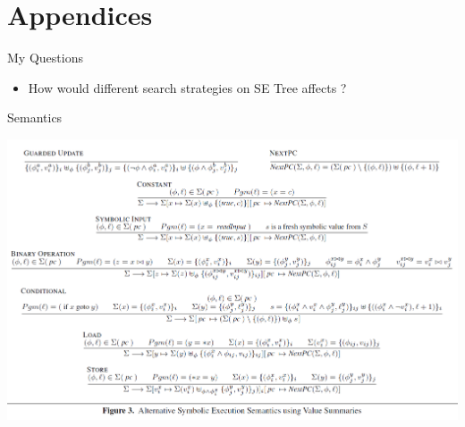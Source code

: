 \documentclass[xcolor={dvipsnames,table},16pt]{beamer}
\begin{document}
\begin{frame}
    \printbibliography
\end{frame}

\appendix

\section*{Appendices}

\begin{frame}{My Questions}
\begin{itemize}
	\item How would different search strategies on SE Tree affects \MultiSE?
\end{itemize}
\end{frame}

%
%

\begin{frame}{\MultiSE Semantics}

	\includegraphics[width=\textwidth]{semantics.png}

\end{frame}
\end{document}
